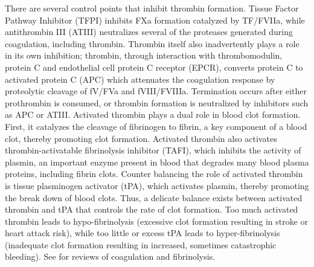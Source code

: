 \documentclass[12pt]{article}
\begin{document}
There are several control points that inhibit thrombin formation.
Tissue Factor Pathway Inhibitor (TFPI) inhibits FXa formation catalyzed by TF/FVIIa, while antithrombin III (ATIII)
neutralizes several of the proteases generated during coagulation, including thrombin.
Thrombin itself also inadvertently plays a role in its own inhibition; thrombin, through interaction with thrombomodulin, protein C and endothelial cell protein C receptor (EPCR),
converts protein C to activated protein C (APC) which attenuates the coagulation response by proteolytic cleavage of fV/FVa and fVIII/FVIIIa.
Termination occurs after either prothrombin is consumed, or thrombin formation is neutralized by inhibitors such as APC or ATIII.
Activated thrombin plays a dual role in blood clot formation.
First, it catalyzes the cleavage of fibrinogen to fibrin, a key component of a blood clot, thereby promoting clot formation.
Activated thrombin also activates thrombin-activatable fibrinolysis inhibitor (TAFI), which inhibits the activity of plasmin, an important enzyme present in blood that degrades many blood plasma proteins, including fibrin clots.
Counter balancing the role of activated thrombin is tissue plasminogen activator (tPA), which activates plasmin, thereby promoting the break down of blood clots.
Thus, a delicate balance exists between activated thrombin and tPA that controls the rate of clot formation.
Too much activated thrombin leads to hypo-fibrinolysis (excessive clot formation resulting in stroke or heart attack risk),
while too little or excess tPA leads to hyper-fibrinolysis (inadequate clot formation resulting in increased, sometimes catastrophic bleeding).
See \cite{Tanaka:2009wo,Chapin:2015aa} for reviews of coagulation and fibrinolysis.
\end{document}
